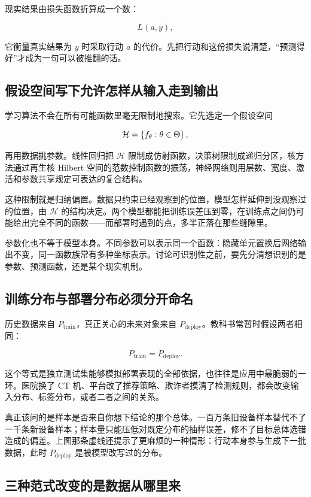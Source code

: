 现实结果由损失函数折算成一个数：

\[
L(a,y),
\]

它衡量真实结果为 \(y\) 时采取行动 \(a\) 的代价。先把行动和这份损失说清楚，``预测得好''才成为一句可以被推翻的话。

\subsection{假设空间写下允许怎样从输入走到输出}

学习算法不会在所有可能函数里毫无限制地搜索。它先选定一个假设空间

\[
\mathcal H=\left\{f_\theta:\theta\in\Theta\right\},
\]

再用数据挑参数。线性回归把 \(\mathcal H\) 限制成仿射函数，决策树限制成递归分区，核方法通过再生核 Hilbert 空间的范数控制函数的振荡，神经网络则用层数、宽度、激活和参数共享规定可表达的复合结构。

这种限制就是归纳偏置。数据只约束已经观察到的位置，模型怎样延伸到没观察过的位置，由 \(\mathcal H\) 的结构决定。两个模型都能把训练误差压到零，在训练点之间仍可能给出完全不同的函数——而部署时遇到的点，多半正落在那些缝隙里。

参数化也不等于模型本身。不同参数可以表示同一个函数：隐藏单元置换后网络输出不变，同一函数族常有多种坐标表示。讨论可识别性之前，要先分清想识别的是参数、预测函数，还是某个现实机制。

\subsection{训练分布与部署分布必须分开命名}

历史数据来自 \(P_{\mathrm{train}}\)，真正关心的未来对象来自 \(P_{\mathrm{deploy}}\)。教科书常暂时假设两者相同：

\[
P_{\mathrm{train}}=P_{\mathrm{deploy}} .
\]

这个等式是独立测试集能够模拟部署表现的全部依据，也往往是应用中最脆弱的一环。医院换了 CT 机、平台改了推荐策略、欺诈者摸清了检测规则，都会改变输入分布、标签分布，或者二者之间的关系。

真正该问的是样本是否来自你想下结论的那个总体。一百万条旧设备样本替代不了一千条新设备样本；样本量只能压低对既定分布的抽样误差，修不了目标总体选错造成的偏差。上图那条虚线还提示了更麻烦的一种情形：行动本身参与生成下一批数据，此时 \(P_{\mathrm{deploy}}\) 是被模型改写过的分布。

\subsection{三种范式改变的是数据从哪里来}

